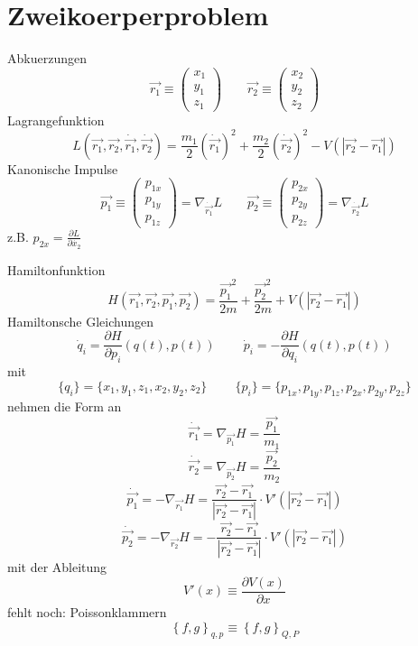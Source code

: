 \documentclass[11pt]{article} %
\begin{document}
\setlength{\parindent}{0ex}


\section{Zweikoerperproblem}

Abkuerzungen
\[
\vec{r_1} \equiv \begin{pmatrix} x_1 \\ y_1 \\ z_1 \end{pmatrix}  \quad \quad 
\vec{r_2} \equiv \begin{pmatrix} x_2 \\ y_2 \\ z_2 \end{pmatrix}
\]
Lagrangefunktion
\[
L(\vec{r_1},\vec{r_2},\dot{\vec{r_1}},\dot{\vec{r_2}}) = 
\frac{m_1}{2}(\dot{\vec{r_1}})^2 +  \frac{m_2}{2}(\dot{\vec{r_2}})^2
- V(\left| \vec{r_2} - \vec{r_1} \right|)
\]
Kanonische Impulse
\[ 
\vec{p_1} \equiv  \begin{pmatrix} p_{1x} \\ p_{1y} \\ p_{1z} \end{pmatrix} = \nabla _{\dot{\vec{r_1}}} L  \quad \quad
\vec{p_2} \equiv  \begin{pmatrix} p_{2x} \\ p_{2y} \\ p_{2z} \end{pmatrix} = \nabla _{\dot{\vec{r_2}}} L 
\]
\centering
z.B.  $ p_{2x} = \frac{\partial L}{\partial \dot{x_2}} $
\par 
\raggedright
Hamiltonfunktion
\[
H(\vec{r_1},\vec{r_2},\vec{p_1},\vec{p_2}) = 
\frac{\vec{p_1}^2}{2m} +  \frac{\vec{p_2}^2}{2m}
+ V(\left| \vec{r_2} - \vec{r_1} \right|)
\]
Hamiltonsche Gleichungen
\[ 
\dot{q}_{i}= \frac{\partial H}{\partial p_{i}}(q(t),p(t))\ \quad \quad 
\dot{p}_{i}=-\frac{\partial H}{\partial q_{i}}(q(t),p(t)) 
\] 
mit
\[ \{q_i\} = \{ x_1, y_1, z_1, x_2, y_2, z_2 \} \  \quad \quad \{p_i\} = \{ p_{1x}, p_{1y}, p_{1z}, p_{2x}, p_{2y}, p_{2z} \} \]
nehmen die Form an
\[ \dot{\vec{r_1}} = \nabla_{\vec{p_1}} H = \frac{\vec{p_1}}{m_1} \]
\[ \dot{\vec{r_2}} = \nabla_{\vec{p_2}} H = \frac{\vec{p_2}}{m_2} \]
\[ \dot{\vec{p_1}} = - \nabla_{\vec{r_1}} H = \frac{\vec{r_2} - \vec{r_1}}{\left|\vec{r_2} - \vec{r_1}\right|} \cdot V'(\left|\vec{r_2} - \vec{r_1}\right|) \]
\[ \dot{\vec{p_2}} = - \nabla_{\vec{r_2}} H = -  \frac{\vec{r_2} - \vec{r_1}}{\left|\vec{r_2} - \vec{r_1}\right|} \cdot V'(\left|\vec{r_2} - \vec{r_1}\right|) \]
mit der Ableitung
\[ V'(x) \equiv \frac{\partial V(x)}{\partial x} \]
fehlt noch: Poissonklammern
\[
\left\{f,g\right\}_{q,p}\equiv \left\{f,g\right\}_{Q,P}
\]
\end{document}
